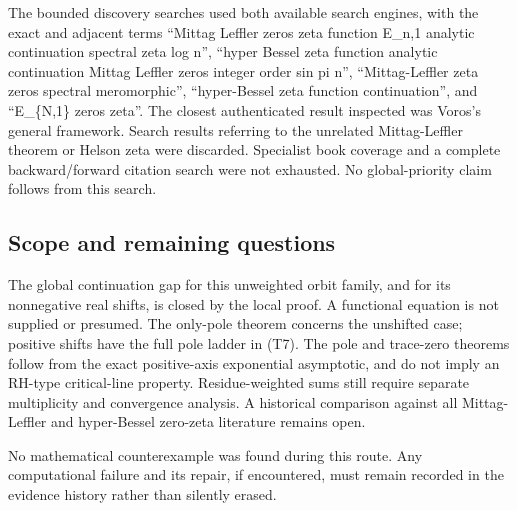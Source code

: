 The bounded discovery searches used both available search engines, with
the exact and adjacent terms ``Mittag Leffler zeros zeta function E\_n,1
analytic continuation spectral zeta log n'', ``hyper Bessel zeta
function analytic continuation Mittag Leffler zeros integer order sin pi
n'', ``Mittag-Leffler zeta zeros spectral meromorphic'', ``hyper-Bessel
zeta function continuation'', and ``E\_\{N,1\} zeros zeta''. The closest
authenticated result inspected was Voros's general framework. Search
results referring to the unrelated Mittag-Leffler theorem or Helson zeta
were discarded. Specialist book coverage and a complete backward/forward
citation search were not exhausted. No global-priority claim follows
from this search.

\hypertarget{scope-and-remaining-questions}{%
\subsection{Scope and remaining
questions}\label{scope-and-remaining-questions}}

The global continuation gap for this unweighted orbit family, and for
its nonnegative real shifts, is closed by the local proof. A functional
equation is not supplied or presumed. The only-pole theorem concerns the
unshifted case; positive shifts have the full pole ladder in (T7). The
pole and trace-zero theorems follow from the exact positive-axis
exponential asymptotic, and do not imply an RH-type critical-line
property. Residue-weighted sums still require separate multiplicity and
convergence analysis. A historical comparison against all Mittag-Leffler
and hyper-Bessel zero-zeta literature remains open.

No mathematical counterexample was found during this route. Any
computational failure and its repair, if encountered, must remain
recorded in the evidence history rather than silently erased.
